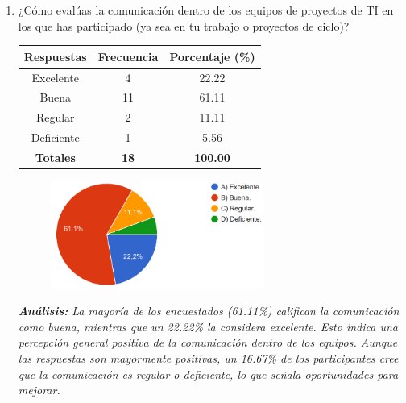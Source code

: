 \documentclass[journal]{IEEEtran}
\begin{document}
\begin{enumerate}
	
	\item ¿Cómo evalúas la comunicación dentro de los equipos de proyectos de TI en los que has participado (ya sea en tu trabajo o proyectos de ciclo)?
	\begin{table}[H]
		\renewcommand{\arraystretch}{1.3}
		\centering
		\begin{tabular}{|c|c|c|}
			\hline
			\textbf{Respuestas} & \textbf{Frecuencia} & \textbf{Porcentaje (\%)}\\
			\hline
			Excelente & 4 & 22.22 \\
			Buena & 11 & 61.11 \\
			Regular & 2 & 11.11\\
			Deficiente & 1 & 5.56\\
			\hline
			\textbf{Totales} &\textbf{18}& \textbf{100.00}\\
			\hline
		\end{tabular}
	\end{table}
	\begin{figure}[h]
		\centering
		\includegraphics[width=07cm]{Pregunta13}
	\end{figure}
	\textit{\textbf{Análisis:} La mayoría de los encuestados (61.11\%) califican la comunicación como buena, mientras que un 22.22\% la considera excelente. Esto indica una percepción general positiva de la comunicación dentro de los equipos. Aunque las respuestas son mayormente positivas, un 16.67\% de los participantes cree que la comunicación es regular o deficiente, lo que señala oportunidades para mejorar.}\\
	

\end{enumerate}
\end{document}
